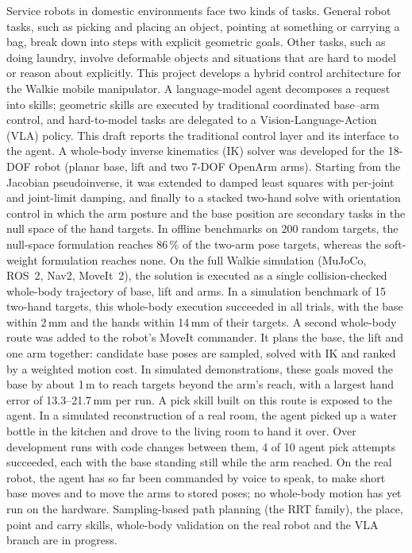 \documentclass[12pt,a4paper]{article}
\begin{document}
Service robots in domestic environments face two kinds of tasks. General robot tasks, such as
picking and placing an object, pointing at something or carrying a bag, break down into steps with explicit geometric goals. Other tasks,
such as doing laundry, involve deformable objects and situations that are hard to model or reason
about explicitly. This project develops a hybrid control architecture for the Walkie mobile
manipulator. A language-model agent decomposes a request into skills; geometric skills are
executed by traditional coordinated base--arm control, and hard-to-model tasks are delegated to a
Vision-Language-Action (VLA) policy. This draft reports the traditional control layer and its
interface to the agent. A whole-body inverse kinematics (IK) solver was developed for the
18-DOF robot (planar base, lift and two 7-DOF OpenArm arms). Starting from the Jacobian
pseudoinverse, it was extended to damped least squares with per-joint and joint-limit damping, and
finally to a stacked two-hand solve with orientation control in which the arm posture and the base
position are secondary tasks in the null space of the hand targets. In offline benchmarks on 200
random targets, the null-space formulation reaches 86\,\% of the two-arm pose targets, whereas the
soft-weight formulation reaches none. On the full Walkie simulation (MuJoCo, ROS~2, Nav2,
MoveIt~2), the solution is executed as a single collision-checked whole-body trajectory of base,
lift and arms. In a simulation benchmark of 15 two-hand targets, this whole-body execution
succeeded in all trials, with the base within 2\,mm and the hands within 14\,mm of their targets.
A second whole-body route was added to the robot's MoveIt commander. It plans the base, the lift and
one arm together: candidate base poses are sampled, solved with IK and ranked by a weighted motion
cost. In simulated demonstrations, these goals moved the base by about 1\,m to reach targets
beyond the arm's reach, with a largest hand error of 13.3--21.7\,mm per run. A pick skill built on
this route is exposed to the agent. In a simulated reconstruction of a real room, the agent picked
up a water bottle in the kitchen and drove to the living room to hand it over. Over development runs
with code changes between them, 4 of 10 agent pick attempts succeeded, each with the base standing
still while the arm reached. On the real robot, the agent has so far been commanded by voice to
speak, to make short base moves and to move the arms to stored poses; no whole-body motion has yet
run on the hardware. Sampling-based path planning (the RRT family), the place, point and carry
skills, whole-body validation on the real robot and the VLA branch are in progress.
\end{document}
